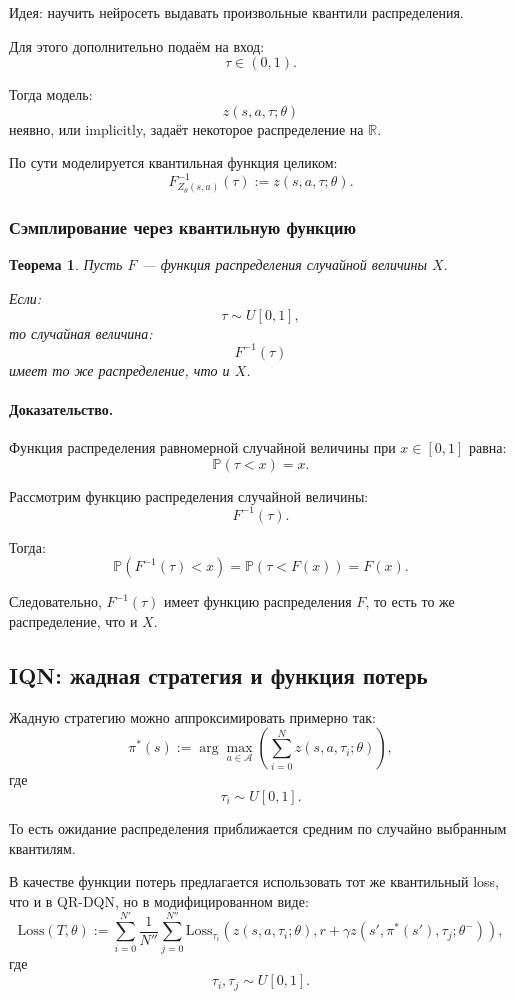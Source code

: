 \documentclass[12pt,a4paper]{article}
\newtheorem{theorem}{Теорема}
\begin{document}
Идея: научить нейросеть выдавать произвольные квантили распределения.

Для этого дополнительно подаём на вход:
\[
\tau \in (0,1).
\]

Тогда модель:
\[
z(s,a,\tau;\theta)
\]
неявно, или implicitly, задаёт некоторое распределение на $\mathbb R$.

По сути моделируется квантильная функция целиком:
\[
F^{-1}_{Z_\theta(s,a)}(\tau)
:=
z(s,a,\tau;\theta).
\]

\subsubsection{Сэмплирование через квантильную функцию}

\begin{theorem}
Пусть $F$ --- функция распределения случайной величины $X$.

Если:
\[
\tau \sim U[0,1],
\]
то случайная величина:
\[
F^{-1}(\tau)
\]
имеет то же распределение, что и $X$.
\end{theorem}

\paragraph{Доказательство.}

Функция распределения равномерной случайной величины при $x \in [0,1]$ равна:
\[
\mathbb P(\tau < x)
=
x.
\]

Рассмотрим функцию распределения случайной величины:
\[
F^{-1}(\tau).
\]

Тогда:
\[
\mathbb P
\left(
F^{-1}(\tau)<x
\right)
=
\mathbb P
\left(
\tau<F(x)
\right)
=
F(x).
\]

Следовательно, $F^{-1}(\tau)$ имеет функцию распределения $F$, то есть то же распределение, что и $X$.

\subsection{IQN: жадная стратегия и функция потерь}

Жадную стратегию можно аппроксимировать примерно так:
\[
\pi^\ast(s)
:=
\arg\max_{a \in \mathcal A}
\left(
\sum_{i=0}^{N}
z(s,a,\tau_i;\theta)
\right),
\]
где
\[
\tau_i \sim U[0,1].
\]

То есть ожидание распределения приближается средним по случайно выбранным квантилям.

В качестве функции потерь предлагается использовать тот же квантильный loss, что и в QR-DQN, но в модифицированном виде:
\[
\mathrm{Loss}(T,\theta)
:=
\sum_{i=0}^{N'}
\frac{1}{N''}
\sum_{j=0}^{N''}
\mathrm{Loss}_{\tau_i}
\left(
z(s,a,\tau_i;\theta),
r
+
\gamma
z(s',\pi^\ast(s'),\tau_j;\theta^-)
\right),
\]
где
\[
\tau_i,\tau_j \sim U[0,1].
\]
\end{document}

